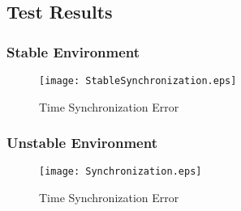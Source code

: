 \documentclass[Main]{subfiles}
\begin{document}
		
	

	\subsection{Test Results} %
	\label{sub:test_results}



		\subsubsection{Stable Environment} %
		\label{sub:stable_environment}
			
			\begin{figure}[H]
				\centering
				\texttt{[image: StableSynchronization.eps]}
				\caption{Time Synchronization Error}
				\label{fig:Synchronization}
			\end{figure}


		\subsubsection{Unstable Environment} %
		\label{sub:unstable_environment}
			
			\begin{figure}[H]
				\centering
				\texttt{[image: Synchronization.eps]}
				\caption{Time Synchronization Error}
				\label{fig:Synchronization}
			\end{figure}

	

\end{document}
